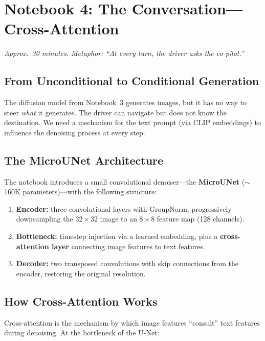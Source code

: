\documentclass[11pt,a4paper]{article}
\begin{document}
\section{Notebook 4: The Conversation---Cross-Attention}
\label{sec:nb4}

\textit{Approx.\ 30 minutes.  Metaphor: ``At every turn, the driver asks
the co-pilot.''}

\subsection{From Unconditional to Conditional Generation}

The diffusion model from Notebook~3 generates images, but it has no way
to steer \emph{what} it generates.  The driver can navigate but does not
know the destination.  We need a mechanism for the text prompt (via CLIP
embeddings) to influence the denoising process at every step.

\subsection{The MicroUNet Architecture}

The notebook introduces a small convolutional denoiser---the
\textbf{MicroUNet} ($\sim$160K parameters)---with the following
structure:

\begin{enumerate}[nosep]
  \item \textbf{Encoder:} three convolutional layers with GroupNorm,
        progressively downsampling the $32 \times 32$ image to an
        $8 \times 8$ feature map (128 channels).
  \item \textbf{Bottleneck:} timestep injection via a learned embedding,
        plus a \textbf{cross-attention layer} connecting image features to
        text features.
  \item \textbf{Decoder:} two transposed convolutions with skip
        connections from the encoder, restoring the original resolution.
\end{enumerate}

\subsection{How Cross-Attention Works}

Cross-attention is the mechanism by which image features ``consult'' text
features during denoising.  At the bottleneck of the U-Net:
\end{document}
